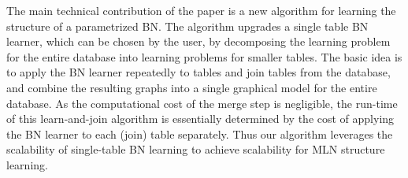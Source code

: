 \documentclass[letterpaper]{article}
\begin{document}




The main technical contribution of the paper is a new algorithm for learning the structure of a parametrized BN.  The algorithm upgrades a single table BN learner, which can be chosen by the user,
by decomposing the learning problem for the entire database into learning problems for smaller tables. The basic idea is to apply the BN learner repeatedly to tables and join tables from the database, and combine the resulting graphs into a single graphical model for the entire database. As the computational cost of the merge step is negligible, the run-time of this learn-and-join algorithm is essentially determined by the cost of applying the BN learner to each (join) table separately. Thus our algorithm leverages the scalability of single-table BN learning to achieve scalability for MLN structure learning.
\end{document}
